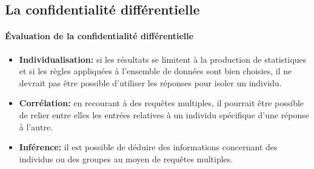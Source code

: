 \subsection{La confidentialité différentielle}



\paragraph{Évaluation de la confidentialité différentielle}
\begin{itemize}
    \item \textbf{Individualisation:} si les résultats se limitent à la production de statistiques et si les règles appliquées à l’ensemble de données sont bien choisies, il ne devrait pas être possible d’utiliser les réponses pour isoler un individu. 

    \item \textbf{Corrélation:} en recourant à des requêtes multiples, il pourrait être possible de relier entre elles les entrées relatives à un individu spécifique d’une réponse à l’autre. 

    \item \textbf{Inférence:} il est possible de déduire des informations concernant des individus ou des groupes au moyen de requêtes multiples. 
\end{itemize}
